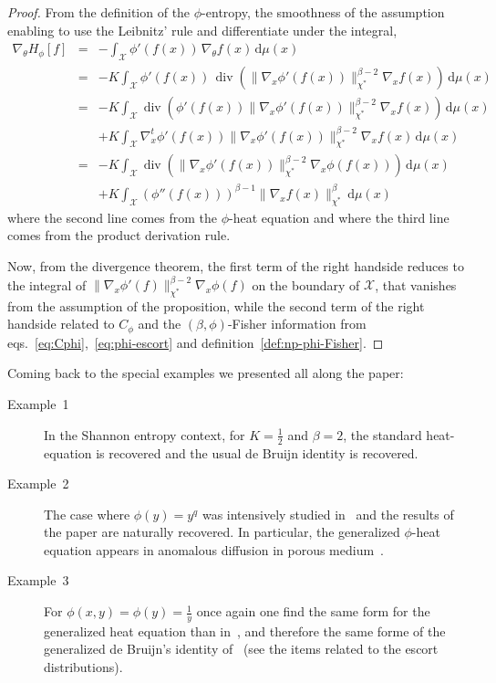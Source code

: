 \documentclass[entropy,article,submit,moreauthors,pdftex]{Definitions/mdpi}
\newcommand{\SZ}[1]{{\color{blue} #1}}
\def\dmu{\mathrm{d}\mu}
\def\X{\mathcal{X}}
\def\div{\operatorname{div}}
\begin{document}
\begin{proof}
  From the  definition of the  $\phi$-entropy, the smoothness of  the assumption
  enabling to use the Leibnitz' rule and differentiate under the integral,
  \SZ{
  \begin{eqnarray*}
  \displaystyle \nabla_\theta H_\phi[f] & = & \displaystyle - \int_\X
  \phi'(f(x)) \, \nabla_\theta f(x) \, \dmu(x)
  \\[2.5mm]
  & = & \displaystyle - K \int_\X \phi'(f(x)) \, \div\left( \| \nabla_x
  \phi'(f(x)) \|_{\chi^*}^{\beta-2} \nabla_x f(x) \right) \, \dmu(x)
  \\[2.5mm]
  & = & \displaystyle - K \int_\X \div\left( \phi'(f(x)) \| \nabla_x \phi'(f(x))
  \|_{\chi^*}^{\beta-2} \nabla_x f(x) \right) \, \dmu(x)
  \\[2.5mm]
  & & \displaystyle + K \int_\X \nabla_x^t
  \phi'(f(x)) \| \nabla_x \phi'(f(x)) \|_{\chi^*}^{\beta-2} \nabla_x f(x) \,
  \dmu(x)
  \\[2.5mm]
  & = & \displaystyle - K \int_\X \div\left( \| \nabla_x \phi'(f(x))
  \|_{\chi^*}^{\beta-2} \nabla_x \phi(f(x)) \right) \, \dmu(x)
  \\[2.5mm]
  & & \displaystyle  + K \int_\X
  \left( \phi''(f(x)) \right)^{\beta-1} \| \nabla_x f(x) \|_{\chi^*}^\beta \,
  \dmu(x)
  \end{eqnarray*}
  }
  where the second line comes from  the $\phi$-heat equation and where the third
  line comes from the product derivation rule.

  Now, from the divergence theorem, the first term of the right handside reduces
  to  the  integral  of  $\| \nabla_x  \phi'(f)  \|_{\chi^*}^{\beta-2}  \nabla_x
  \phi(f)$ on  the boundary of  $\X$, that vanishes  from the assumption  of the
  proposition, while the  second term of the right handside  related to $C_\phi$
  and         the         $(\beta,\phi)$-Fisher         information         from
  eqs.~\eqref{eq:Cphi},~\eqref{eq:phi-escort}                                and
  definition~\ref{def:np-phi-Fisher}.
\end{proof}

Coming back to the special examples we presented all along the paper:
%
\begin{description}
\item[Example~1] In the Shannon entropy context,  for $K = \frac12$ and $\beta =
  2$, the standard  heat-equation is recovered and the usual  de Bruijn identity
  is recovered.
%
\item[Example~2]  The  case  where  $\phi(y)  =  y^q$  was  intensively  studied
  in~\cite{Ber13:08} and the  results of the paper are  naturally recovered.  In
  particular,  the   generalized  $\phi$-heat  equation  appears   in  anomalous
  diffusion in porous medium~\cite{TsaLen02, Ber13:08, Vaz06}.
%
\item[Example~3] For $\phi(x,y) = \phi(y) = \frac{1}{y}$ \SZ{once again one find
  the  same  form for  the  generalized  heat equation  than  in~\cite{TsaLen02,
    Ber13:08,  Vaz06},  and therefore  the  same  forme  of the  generalized  de
  Bruijn's identity  of~\cite{Ber13:08}} (see  the items  related to  the escort
  distributions).
\end{description}
\end{document}
